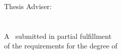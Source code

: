 \begin{titlepage}
\center

\Large \university{} \campus\\[1.5cm]

\large \department\\[2cm]


{\huge\bfseries\thesistitle}\\[2cm]

\student\\
\medskip
\studentnumber\\[2cm]

Thesis Adviser:\\
\medskip
\adviser\\[2cm]

{\large \submissiondate}\\[2cm]

 A \thesistype\ submitted in partial fulfillment\\of the requirements for the degree of\\
\degree

\end{titlepage}
